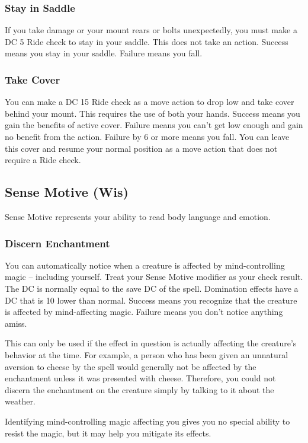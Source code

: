 \subsubsection{Stay in Saddle}
If you take damage or your mount rears or bolts unexpectedly, you must make a DC 5 Ride check to stay in your saddle. This does not take an action. Success means you stay in your saddle. Failure means you fall.

\subsubsection{Take Cover}
You can make a DC 15 Ride check as a move action to drop low and take cover behind your mount. This requires the use of both your hands. Success means you gain the benefits of active cover. Failure means you can't get low enough and gain no benefit from the action. Failure by 6 or more means you fall. You can leave this cover and resume your normal position as a move action that does not require a Ride check.

\subsection{Sense Motive (Wis)}
Sense Motive represents your ability to read body language and emotion.

\subsubsection{Discern Enchantment}
You can automatically notice when a creature is affected by mind-controlling magic -- including yourself. Treat your Sense Motive modifier as your check result. The DC is normally equal to the save DC of the spell. Domination effects have a DC that is 10 lower than normal. Success means you recognize that the creature is affected by mind-affecting magic. Failure means you don't notice anything amiss.

This can only be used if the effect in question is actually affecting the creature's behavior at the time. For example, a person who has been given an unnatural aversion to cheese by the  spell would generally not be affected by the enchantment unless it was presented with cheese. Therefore, you could not discern the enchantment on the creature simply by talking to it about the weather. 

Identifying mind-controlling magic affecting you gives you no special ability to resist the magic, but it may help you mitigate its effects.

